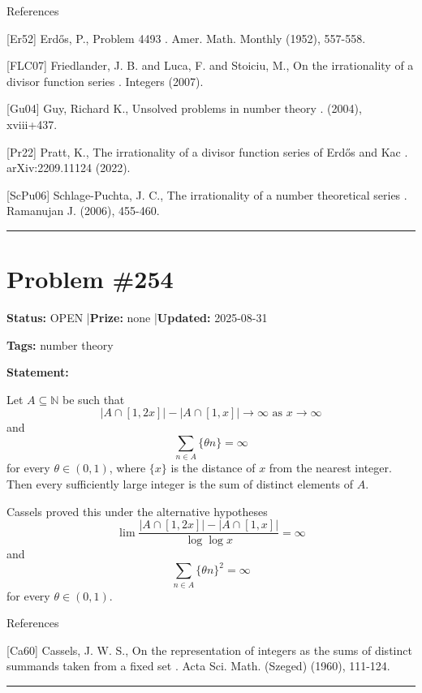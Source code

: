 \documentclass{article}
\begin{document}
References

[Er52] Erd\H{o}s, P., Problem 4493 . Amer. Math. Monthly (1952), 557-558.

[FLC07] Friedlander, J. B. and Luca, F. and Stoiciu, M., On the irrationality of a divisor function series . Integers (2007).

[Gu04] Guy, Richard K., Unsolved problems in number theory . (2004), xviii+437.

[Pr22] Pratt, K., The irrationality of a divisor function series of Erd\H{o}s and Kac . arXiv:2209.11124 (2022).

[ScPu06] Schlage-Puchta, J. C., The irrationality of a number theoretical series . Ramanujan J. (2006), 455-460.

\noindent\rule{\linewidth}{0.4pt}


\section{Problem \#254}
\label{prob:254}

\noindent\textbf{Status:} OPEN \quad|\quad \textbf{Prize:} none \quad|\quad \textbf{Updated:} 2025-08-31

\noindent\textbf{Tags:} number theory

\medskip

\noindent\textbf{Statement:}

Let $A\subseteq \mathbb{N}$ be such that\[\lvert A\cap [1,2x]\rvert -\lvert A\cap [1,x]\rvert \to \infty\textrm{ as }x\to \infty\]and\[\sum_{n\in A} \{ \theta n\}=\infty\]for every $\theta\in (0,1)$, where $\{x\}$ is the distance of $x$ from the nearest integer. Then every sufficiently large integer is the sum of distinct elements of $A$.




Cassels \cite{Ca60} proved this under the alternative hypotheses\[\lim \frac{\lvert A\cap [1,2x]\rvert -\lvert A\cap [1,x]\rvert}{\log\log x}=\infty\]and\[\sum_{n\in A} \{ \theta n\}^2=\infty\]for every $\theta\in (0,1)$.




References

[Ca60] Cassels, J. W. S., On the representation of integers as the sums of distinct summands taken from a fixed set . Acta Sci. Math. (Szeged) (1960), 111-124.

\noindent\rule{\linewidth}{0.4pt}


\end{document}
